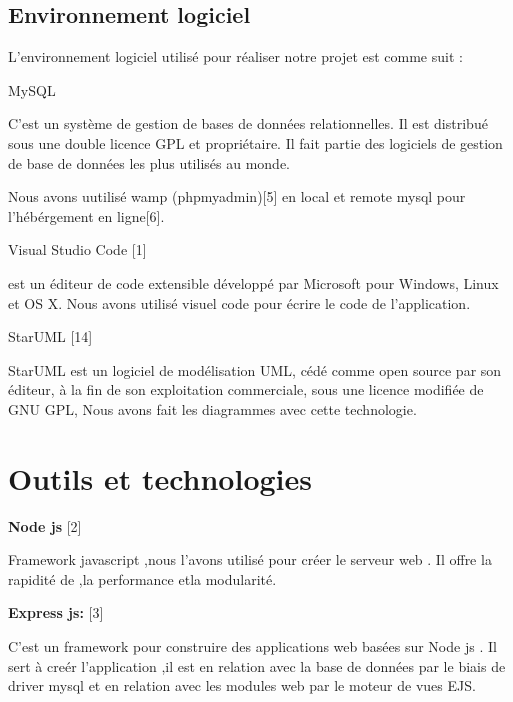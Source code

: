   \subsection{Environnement logiciel}


L'environnement logiciel utilis\'{e} pour r\'{e}aliser notre projet est comme suit : \newline


\textbullet{} MySQL

C'est un syst\`{e}me de gestion de bases de données relationnelles. Il est distribu\'{e}
sous une double licence GPL et propri\'{e}taire. Il fait partie des logiciels de gestion
de base de donn\'{e}es les plus utilis\'{e}s au monde.

Nous avons uutilis\'{e} wamp (phpmyadmin)[5]  en local et remote mysql pour l'h\'{e}b\'{e}rgement en ligne[6]. \newline

\textbullet{} Visual Studio Code  [1]

est un \'{e}diteur de code extensible d\'{e}velopp\'{e} par Microsoft pour Windows,
Linux et OS X.
Nous avons utilis\'{e} visuel code pour \'{e}crire le code de l'application. \newline

\textbullet{}StarUML [14]

StarUML est un logiciel de mod\'{e}lisation UML, c\'{e}d\'{e} comme open source par son \'{e}diteur, \`{a} la
fin de son exploitation commerciale, sous une licence modifi\'{e}e de GNU GPL, Nous avons fait
les diagrammes avec cette technologie.





\section{Outils et technologies }

\textbf{ Node js} [2]

Framework javascript ,nous l'avons utilis\'{e} pour cr\'{e}er le serveur web .
Il offre la rapidit\'{e} de ,la performance etla modularit\'{e}.\newline



\textbf{ Express js:} [3]



 C'est un framework pour construire des
 applications web bas\'{e}es sur Node js .
 Il  sert \`{a} cre\'{e}r l'application ,il est en
relation avec la base de donn\'{e}es par le biais de driver mysql et en relation
avec les modules web par le moteur de vues EJS.\newline





